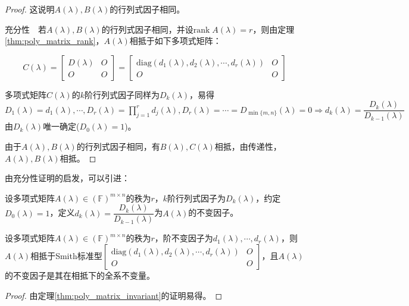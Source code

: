 \begin{proof}
            这说明$A(\lambda),B(\lambda)$的行列式因子相同。

            充分性$\quad$若$A(\lambda),B(\lambda)$的行列式因子相同，并设$\mathrm{rank}\;A(\lambda)=r$，则由定理\ref{thm:poly_matrix_rank}，$A(\lambda)$相抵于如下多项式矩阵：

            \[
                C(\lambda)=\begin{bmatrix}D(\lambda)&O\\O&O\end{bmatrix}=\begin{bmatrix}\mathrm{diag}(d_1(\lambda),d_2(\lambda),\cdots,d_r(\lambda))&O\\O&O\end{bmatrix}
            \]

            多项式矩阵$C(\lambda)$的$k$阶行列式因子同样为$D_k(\lambda)$，易得$D_1(\lambda)=d_1(\lambda),\cdots,D_r(\lambda)=\prod\limits_{j=1}^{r}d_j(\lambda),D_r(\lambda)=\cdots=D_{\min\{m,n\}}(\lambda)=0\Rightarrow d_k(\lambda)=\dfrac{D_k(\lambda)}{D_{k-1}(\lambda)}$由$D_k(\lambda)$唯一确定($D_0(\lambda)=1$)。

            由于$A(\lambda),B(\lambda)$的行列式因子相同，有$B(\lambda),C(\lambda)$相抵，由传递性，$A(\lambda),B(\lambda)$相抵。
        \end{proof}

        由充分性证明的启发，可以引进：

        \begin{definition}[不变因子]
            设多项式矩阵$A(\lambda)\in(\mathbb{F})^{m\times n}$的秩为$r$，$k$阶行列式因子为$D_k(\lambda)$，约定$D_0(\lambda)=1$，定义$d_k(\lambda)=\dfrac{D_k(\lambda)}{D_{k-1}(\lambda)}$为$A(\lambda)$的不变因子。
        \end{definition}

        \begin{theorem}
            \label{thm:poly_matrix_Smith}
            设多项式矩阵$A(\lambda)\in(\mathbb{F})^{m\times n}$的秩为$r$，阶不变因子为$d_1(\lambda),\cdots,d_r(\lambda)$，则$A(\lambda)$相抵于Smith标准型$\begin{bmatrix}\mathrm{diag}(d_1(\lambda),d_2(\lambda),\cdots,d_r(\lambda))&O\\O&O\end{bmatrix}$，且$A(\lambda)$的不变因子是其在相抵下的全系不变量。
        \end{theorem}

        \begin{proof}
            由定理\ref{thm:poly_matrix_invariant}的证明易得。
        \end{proof}

